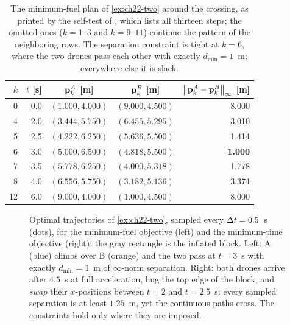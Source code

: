 \begin{table}[tb]
  \centering\small
  \caption{The minimum-fuel plan of \cref{ex:ch22-two} around the crossing,
  as printed by the self-test of , which lists all
  thirteen steps; the omitted ones ($k = 1$--$3$ and $k = 9$--$11$) continue
  the pattern of the neighboring rows. The separation
  constraint is tight at $k = 6$, where the two drones pass each other with
  exactly $d_{\min} = 1$~m; everywhere else it is slack.}
  \label{tab:ch22-steps}
  \begin{tabular}{@{}rrccr@{}}
  \toprule
  $k$ & $t$ [s] & $\mathbf{p}^A_k$ [m] & $\mathbf{p}^B_k$ [m] & $\left\lVert \mathbf{p}^A_k - \mathbf{p}^B_k \right\rVert_\infty$ [m]\\
  \midrule
  0 & 0.0 & $(1.000, 4.000)$ & $(9.000, 4.500)$ & 8.000\\
  4 & 2.0 & $(3.444, 5.750)$ & $(6.455, 5.295)$ & 3.010\\
  5 & 2.5 & $(4.222, 6.250)$ & $(5.636, 5.500)$ & 1.414\\
  6 & 3.0 & $(5.000, 6.500)$ & $(4.818, 5.500)$ & \textbf{1.000}\\
  7 & 3.5 & $(5.778, 6.250)$ & $(4.000, 5.318)$ & 1.778\\
  8 & 4.0 & $(6.556, 5.750)$ & $(3.182, 5.136)$ & 3.374\\
  12 & 6.0 & $(9.000, 4.000)$ & $(1.000, 4.500)$ & 8.000\\
  \bottomrule
  \end{tabular}
\end{table}

\begin{figure}[tb]
  \centering
  \caption{Optimal trajectories of \cref{ex:ch22-two}, sampled every
  $\Delta t = 0.5$~s (dots), for the minimum-fuel objective (left) and the
  minimum-time objective (right); the gray rectangle is the inflated block.
  Left: A (blue) climbs over B (orange) and the two pass at $t = 3$~s with
  exactly $d_{\min} = 1$~m of $\infty$-norm separation. Right: both drones
  arrive after $4.5$~s at full acceleration, hug the top edge of the block,
  and \emph{swap} their $x$-positions between $t = 2$ and $t = 2.5$~s: every
  sampled separation is at least $1.25$~m, yet the continuous paths cross.
  The constraints hold only where they are imposed.}
  \label{fig:ch22-example}
\end{figure}


